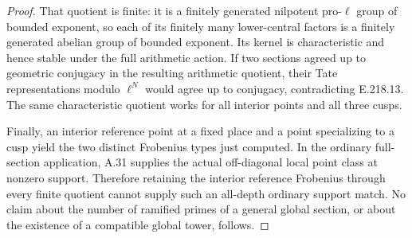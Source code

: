 \begin{proof}
That quotient is finite: it is a finitely generated nilpotent pro-$\ell$
group of bounded exponent, so each of its finitely many lower-central
factors is a finitely generated abelian group of bounded exponent.
Its kernel is characteristic and hence stable under the full arithmetic
action. If two sections agreed up to geometric conjugacy in the resulting
arithmetic quotient, their Tate representations modulo $\ell^N$ would
agree up to conjugacy, contradicting E.218.13. The same characteristic
quotient works for all interior points and all three cusps.

Finally, an interior reference point at a fixed place and a point
specializing to a cusp yield the two distinct Frobenius types just computed.
In the ordinary full-section application, A.31 supplies the actual
off-diagonal local point class at nonzero support. Therefore retaining
the interior reference Frobenius through every finite quotient cannot
supply such an all-depth ordinary support match. No claim about the
number of ramified primes of a general global section, or about the
existence of a compatible global tower, follows.
\end{proof}
